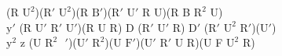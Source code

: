 (R $\text{U}^2$)($\text{R}'$ $\text{U}^2$)(R $\text{B}'$)($\text{R}'$ $\text{U}'$ R U)(R B $\text{R}^2$ U)\\
$\text{y}'$ (R $\text{U}'$ $\text{R}'$ $\text{U}'$)(R U R) D ($\text{R}'$ $\text{U}'$ R) $\text{D}'$ ($\text{R}'$ $\text{U}^2$ $\text{R}'$)($\text{U}'$)\\
$\text{y}^2$ z (U $\text{R}^2$$\text{ }'$)($\text{U}'$ $\text{R}^2$)(U $\text{F}'$)($\text{U}'$ $\text{R}'$ U R)(U F $\text{U}^2$ R)\\
